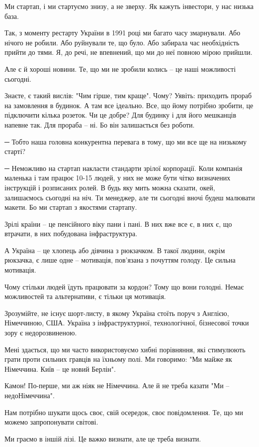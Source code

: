 Ми стартап, і ми стартуємо знизу, а не зверху. Як кажуть інвестори, у нас
низька база.

Так, з моменту рестарту України в 1991 році ми багато часу змарнували. Або
нічого не робили. Або руйнували те, що було. Або забирала час необхідність
прийти до тями. Я, до речі, не впевнений, що ми до неї повною мірою прийшли.

Але є й хороші новини. Те, що ми не зробили колись – це наші можливості
сьогодні. 

Знаєте, є такий вислів: "Чим гірше, тим краще". Чому? Уявіть: приходить прораб
на замовлення в будинок. А там все ідеально. Все, що йому потрібно зробити, це
підключити кілька розеток. Чи це добре? Для будинку і для його мешканців
напевне так. Для прораба – ні. Бо він залишається без роботи.

─ Тобто наша головна конкурентна перевага в тому, що ми все ще на низькому
старті?

─ Неможливо на стартап накласти стандарти зрілої корпорації. Коли компанія
маленька і там працює 10-15 людей, у них не може бути чітко визначених
інструкцій і розписаних ролей. В будь яку мить можна сказати, окей, залишаємось
сьогодні на ніч. Ти менеджер, але ти сьогодні вночі будеш малювати макети. Бо
ми стартап з якостями стартапу.

Зрілі країни – це пенсійного віку пани і пані. В них вже все є, в них є, що
втрачати, в них побудована інфраструктура.

А Україна – це хлопець або дівчина з рюкзачком. В такої людини, окрім рюкзачка,
є лише одне – мотивація, пов’язана з почуттям голоду. Це сильна мотивація. 

Чому стільки людей їдуть працювати за кордон? Тому що вони голодні. Немає
можливостей та альтернативи, є тільки ця мотивація.

Зрозумійте, не існує шорт-листу, в якому Україна стоїть поруч з Англією,
Німеччиною, США. Україна з інфраструктурної, технологічної, бізнесової точки
зору є недорозвиненою.

Мені здається, що ми часто використовуємо хибні порівняння, які стимулюють
грати проти сильних гравців на їхньому полі. Ми говоримо: "Ми майже як
Німеччина. Київ – це новий Берлін".

Камон! По-перше, ми аж ніяк не Німеччина. Але й не треба казати "Ми –
недоНімеччина".

Нам потрібно шукати щось своє, свій осередок, своє повідомлення. Те, що ми
можемо запропонувати світові.

Ми граємо в іншій лізі. Це важко визнати, але це треба визнати.

